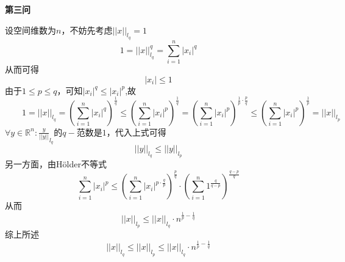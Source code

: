 \documentclass[12pt]{article}
\begin{document}
	\begin{center}
		\textbf{第三问}
	\end{center}
	设空间维数为$n$，不妨先考虑$\vert\vert{x}\vert\vert_{l_q}=1$
	$$1=\vert\vert{x}\vert\vert_{l_q}^q=\sum_{i=1}^{n}{\vert{x_i}\vert^q}$$
	从而可得$$\vert{x_i}\vert\le1$$
	由于$1\le{p}\le{q}$，可知$\vert{x_i}\vert^q\le\vert{x_i}\vert^p$,故$$\quad\quad1=\vert\vert{x}\vert\vert_{l_q}=(\sum_{i=1}^{n}{\vert{x_i}\vert^q})^\frac{1}{q}\le(\sum_{i=1}^{n}{\vert{x_i}\vert^p})^\frac{1}{q}=(\sum_{i=1}^{n}{\vert{x_i}\vert^p})^{\frac{1}{p}\cdot\frac{p}{q}}\le(\sum_{i=1}^{n}{\vert{x_i}\vert^p})^\frac{1}{p}=\vert\vert{x}\vert\vert_{l_p}$$
	$\forall{y}\in\mathbb{R}^n: \frac{y}{\vert\vert{y}\vert\vert}_{l_q}$的$q-$范数是$1$，代入上式可得$$\vert\vert{y}\vert\vert_{l_q}\le\vert\vert{y}\vert\vert_{l_p}$$
	另一方面，由Hölder不等式$$\sum_{i=1}^n\vert{x_i}\vert^p\le(\sum_{i=1}^n\vert{x_i}\vert^{p\cdot\frac{q}{p}})^\frac{p}{q}\cdot(\sum_{i=1}^n1^\frac{q}{q-p})^\frac{q-p}{q}$$
	从而$$\vert\vert{x}\vert\vert_{l_p}\le\vert\vert{x}\vert\vert_{l_q}\cdot{n^{\frac{1}{p}-\frac{1}{q}}}$$
	综上所述$$\vert\vert{x}\vert\vert_{l_q}\le\vert\vert{x}\vert\vert_{l_p}\le\vert\vert{x}\vert\vert_{l_q}\cdot{n^{\frac{1}{p}-\frac{1}{q}}}$$
\end{document}
